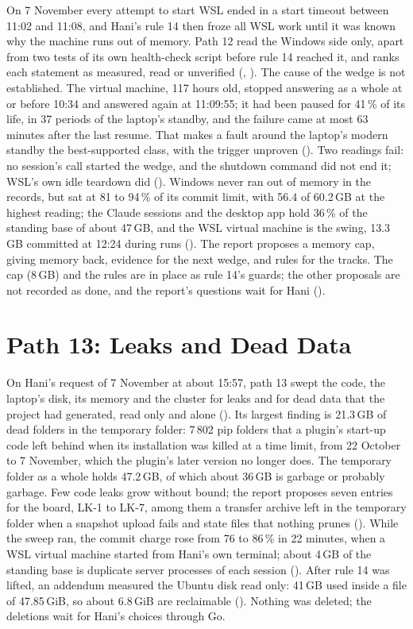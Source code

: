 On 7 November every attempt to start WSL ended in a start timeout between 11:02 and
11:08, and Hani's rule 14 then froze all WSL work until it was known why the machine
runs out of memory. Path 12 read the Windows side only, apart from two tests of its own health-check script before rule 14 reached it, and
ranks each statement as measured, read or unverified (, ). The cause of
the wedge is not established. The virtual machine, 117 hours old, stopped answering as a
whole at or before 10:34 and answered again at 11:09:55; it had been paused for 41\,\%
of its life, in 37 periods of the laptop's standby, and the failure came at most 63
minutes after the last resume. That makes a fault around the laptop's modern standby the
best-supported class, with the trigger unproven (). Two readings fail: no
session's call started the wedge, and the shutdown command did not end it; WSL's own
idle teardown did (). Windows never ran out of memory in the records, but sat at
81 to 94\,\% of its commit limit, with 56.4 of 60.2\,GB at the highest reading; the
Claude sessions and the desktop app hold 36\,\% of the standing base of about 47\,GB, and
the WSL virtual machine is the swing, 13.3\,GB committed at 12:24 during runs
(). The report proposes a memory cap, giving memory back, evidence for the next
wedge, and rules for the tracks. The cap (8\,GB) and the rules are in place as rule
14's guards; the other proposals are not recorded as done, and the report's questions
wait for Hani ().

\section{Path 13: Leaks and Dead Data}
\label{sec:path13}

On Hani's request of 7 November at about 15:57, path 13 swept the code, the laptop's
disk, its memory and the cluster for leaks and for dead data that the project had
generated, read only and alone (). Its largest finding is 21.3\,GB of dead
folders in the temporary folder: 7\,802 pip folders that a plugin's start-up code left
behind when its installation was killed at a time limit, from 22 October to 7 November,
which the plugin's later version no longer does. The temporary folder as a whole holds
47.2\,GB, of which about 36\,GB is garbage or probably garbage. Few code leaks grow
without bound; the report proposes seven entries for the board, LK-1 to LK-7, among
them a transfer archive left in the temporary folder when a snapshot upload fails and
state files that nothing prunes (). While the sweep ran, the commit charge rose
from 76 to 86\,\% in 22 minutes, when a WSL virtual machine started from Hani's own
terminal; about 4\,GB of the standing base is duplicate server processes of each
session (). After rule 14 was lifted, an addendum measured the Ubuntu disk read
only: 41\,GB used inside a file of 47.85\,GiB, so about 6.8\,GiB are reclaimable
(). Nothing was deleted; the deletions wait for Hani's choices through Go.

